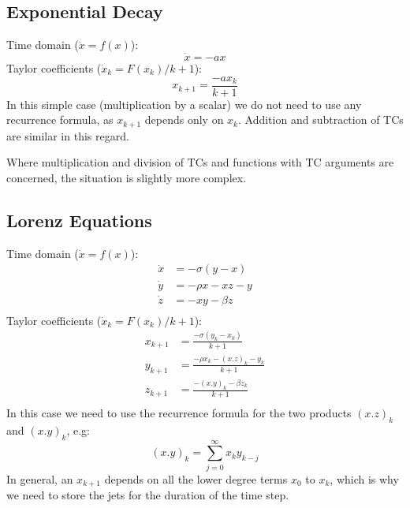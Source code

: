 \documentclass[11pt]{article}
\begin{document}
\subsection{Exponential Decay}
Time domain ($\dot{x} = f(x)$):
\begin{equation}
\dot{x} = - a x
\end{equation}
Taylor coefficients ($\dot{x}_k = F(x_k) / k + 1$):
\begin{equation}
x_{k+1} = \frac{- a x_k} {k + 1}
\end{equation}
In this simple case (multiplication by a scalar) we do not need to use any recurrence formula, as $x_{k+1}$ depends only on $x_k$.
Addition and subtraction of TCs are similar in this regard.

Where multiplication and division of TCs and functions with TC arguments are concerned, the situation is slightly more complex.
\subsection{Lorenz Equations}
Time domain ($\dot{x} = f(x)$):
\begin{equation}
\begin{aligned}
\dot{x} &= - \sigma (y - x) \\
\dot{y} &= - \rho x - xz - y \\
\dot{z} &= - xy - \beta z \\
\end{aligned}
\end{equation}
Taylor coefficients ($\dot{x}_k = F(x_k) / k + 1$):
\begin{equation}
\begin{aligned}
x_{k+1} &= \frac{- \sigma (y_k - x_k)}{k + 1} \\
y_{k+1} &= \frac{- \rho x_k - (x.z)_k - y_k}{k + 1} \\
z_{k+1} &= \frac{- (x.y)_k - \beta z_k}{k + 1} \\
\end{aligned}
\end{equation}
In this case we need to use the recurrence formula for the two products $(x.z)_k$ and $(x.y)_k$, e.g:
\begin{equation}
(x.y)_k = \sum_{j=0}^{\infty} x_k y_{k - j}
\end{equation}
In general, an $x_{k+1}$ depends on all the lower degree terms $x_0$ to $x_k$, which is why we need to store the jets for the duration of the time step.
\end{document}
